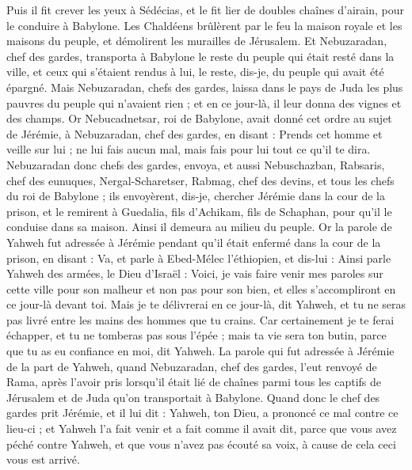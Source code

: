 \begin{multicols}{2}
Puis il fit crever les yeux à Sédécias, et le fit lier de doubles chaînes d'airain, pour le conduire à Babylone.
Les Chaldéens brûlèrent par le feu la maison royale et les maisons du peuple, et démolirent les murailles de Jérusalem.
Et Nebuzaradan, chef des gardes, transporta à Babylone le reste du peuple qui était resté dans la ville, et ceux qui s'étaient rendus à lui, le reste, dis-je, du peuple qui avait été épargné.
Mais Nebuzaradan, chefs des gardes, laissa dans le pays de Juda les plus pauvres du peuple qui n'avaient rien ; et en ce jour-là, il leur donna des vignes et des champs.
Or Nebucadnetsar, roi de Babylone, avait donné cet ordre au sujet de Jérémie, à Nebuzaradan, chef des gardes, en disant :
Prends cet homme et veille sur lui ; ne lui fais aucun mal, mais fais pour lui tout ce qu'il te dira.
Nebuzaradan donc chefs des gardes, envoya, et aussi Nebuschazban, Rabsaris, chef des eunuques, Nergal-Scharetser, Rabmag, chef des devins, et tous les chefs du roi de Babylone ;
ils envoyèrent, dis-je, chercher Jérémie dans la cour de la prison, et le remirent à Guedalia, fils d'Achikam, fils de Schaphan, pour qu'il le conduise dans sa maison. Ainsi il demeura au milieu du peuple.
Or la parole de Yahweh fut adressée à Jérémie pendant qu'il était enfermé dans la cour de la prison, en disant :
Va, et parle à Ebed-Mélec l'éthiopien, et dis-lui : Ainsi parle Yahweh des armées, le Dieu d'Israël : Voici, je vais faire venir mes paroles sur cette ville pour son malheur et non pas pour son bien, et elles s'accompliront en ce jour-là devant toi.
Mais je te délivrerai en ce jour-là, dit Yahweh, et tu ne seras pas livré entre les mains des hommes que tu crains.
Car certainement je te ferai échapper, et tu ne tomberas pas sous l'épée ; mais ta vie sera ton butin, parce que tu as eu confiance en moi, dit Yahweh.
\VerseOne{}La parole qui fut adressée à Jérémie de la part de Yahweh, quand Nebuzaradan, chef des gardes, l'eut renvoyé de Rama, après l'avoir pris lorsqu'il était lié de chaînes parmi tous les captifs de Jérusalem et de Juda qu'on transportait à Babylone.
Quand donc le chef des gardes prit Jérémie, et il lui dit : Yahweh, ton Dieu, a prononcé ce mal contre ce lieu-ci ;
et Yahweh l'a fait venir et a fait comme il avait dit, parce que vous avez péché contre Yahweh, et que vous n'avez pas écouté sa voix, à cause de cela ceci vous est arrivé.

\end{multicols}
